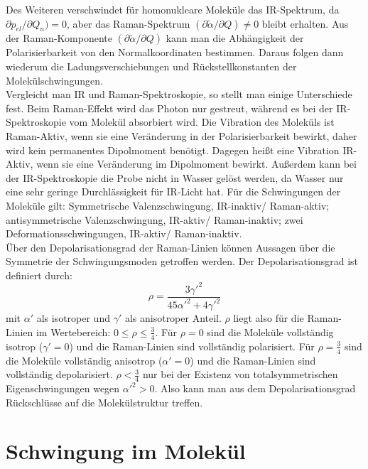 \documentclass[.../bericht]{subfilies}
\begin{document}
      Des Weiteren verschwindet für homonukleare Moleküle das IR-Spektrum, da $\partial p_{el}/ \partial Q_n)=0$, aber das Raman-Spektrum $(\partial \widetilde{\alpha} / \partial Q) \neq 0$ bleibt erhalten. Aus der Raman-Komponente $(\partial \widetilde{\alpha} / \partial Q)$ kann man die Abhängigkeit der Polarisierbarkeit von den Normalkoordinaten bestimmen. Daraus folgen dann wiederum die Ladungsverschiebungen und Rückstellkonstanten der Molekülschwingungen. \\
      Vergleicht man IR und Raman-Spektroskopie, so stellt man einige Unterschiede fest. Beim Raman-Effekt wird das Photon nur gestreut, während es bei der IR-Spektroskopie vom Molekül absorbiert wird. Die Vibration des Moleküls ist Raman-Aktiv, wenn sie eine Veränderung in der Polarisierbarkeit bewirkt, daher wird kein permanentes Dipolmoment benötigt. Dagegen heißt eine Vibration IR-Aktiv, wenn sie eine Veränderung im Dipolmoment bewirkt. Außerdem kann bei der IR-Spektroskopie die Probe nicht in Wasser gelöst werden, da Wasser nur eine sehr geringe Durchlässigkeit für IR-Licht hat. Für die Schwingungen der Moleküle gilt: Symmetrische Valenzschwingung, IR-inaktiv/ Raman-aktiv; antisymmetrische Valenzschwingung, IR-aktiv/ Raman-inaktiv; zwei Deformationsschwingungen, IR-aktiv/ Raman-inaktiv. \\
      Über den Depolarisationsgrad der Raman-Linien können Aussagen über die Symmetrie der Schwingungsmoden getroffen werden. Der Depolarisationsgrad ist definiert durch:
      \begin{equation}
        \rho=\frac{3\gamma'^2}{45{\alpha'^2}+4\gamma'^2}
        \label{eq:depolarisation}
      \end{equation}
      mit $\alpha'$ als isotroper und $\gamma'$ als anisotroper Anteil. $\rho$ liegt also für die Raman-Linien im Wertebereich: $0\leq \rho \leq \frac{3}{4}$. Für $\rho=0$ sind die Moleküle vollständig isotrop ($\gamma'=0$) und die Raman-Linien sind vollständig polarisiert. Für $\rho=\frac{3}{4}$ sind die Moleküle vollständig anisotrop ($\alpha'=0$) und die Raman-Linien sind vollständig depolarisiert. $\rho<\frac{3}{4}$ nur bei der Existenz von totalsymmetrischen Eigenschwingungen wegen $\alpha'^2>0$. Also kann man aus dem Depolarisationsgrad Rückschlüsse auf die Molekülstruktur treffen.\\
      \cite{raman-ir} \cite{molekuel}

  \section{Schwingung im Molekül}
\end{document}

